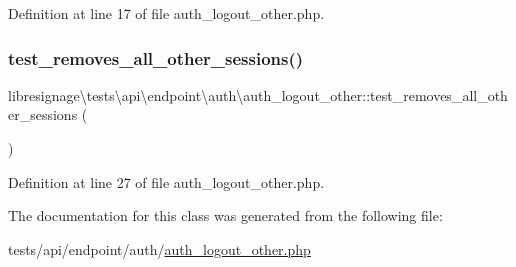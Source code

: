 Definition at line 17 of file auth\+\_\+logout\+\_\+other.\+php.

\mbox{\label{classlibresignage_1_1tests_1_1api_1_1endpoint_1_1auth_1_1auth__logout__other_ae8719326784482d405b52884cc5b3a83}} 
\subsubsection{\texorpdfstring{test\+\_\+removes\+\_\+all\+\_\+other\+\_\+sessions()}{test\_removes\_all\_other\_sessions()}}
{\footnotesize\ttfamily libresignage\textbackslash{}tests\textbackslash{}api\textbackslash{}endpoint\textbackslash{}auth\textbackslash{}auth\+\_\+logout\+\_\+other\+::test\+\_\+removes\+\_\+all\+\_\+other\+\_\+sessions (\begin{DoxyParamCaption}{ }\end{DoxyParamCaption})}



Definition at line 27 of file auth\+\_\+logout\+\_\+other.\+php.



The documentation for this class was generated from the following file\+:\begin{DoxyCompactItemize}
\item 
tests/api/endpoint/auth/\hyperlink{tests_2api_2endpoint_2auth_2auth__logout__other_8php}{auth\+\_\+logout\+\_\+other.\+php}\end{DoxyCompactItemize}
